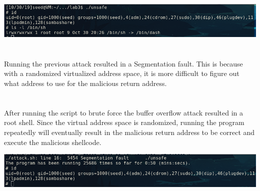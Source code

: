 \documentclass[12pt]{exam}
\begin{document}
\vspace*{.2in}
\noindent
\includegraphics[width=\textwidth]{q3}

\section{}

Running the previous attack resulted in a Segmentation fault.  This is because
with a randomized virtualized address space, it is more difficult to figure out
what address to use for the malicious return address.

\section{}

After running the script to brute force the buffer overflow attack resulted in
a root shell.  Since the virtual address space is randomized, running the
program repeatedly will eventually result in the malicious return address to be
correct and execute the malicious shellcode.

\vspace*{.2in}
\noindent
\includegraphics[width=\textwidth]{q5}
\end{document}
